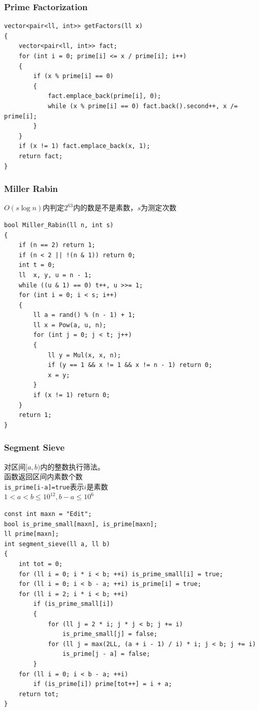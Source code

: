 \documentclass[twoside]{article}
\begin{document}
\subsubsection{Prime Factorization}
\begin{lstlisting}
vector<pair<ll, int>> getFactors(ll x)
{
    vector<pair<ll, int>> fact;
    for (int i = 0; prime[i] <= x / prime[i]; i++)
    {
        if (x % prime[i] == 0)
        {
            fact.emplace_back(prime[i], 0);
            while (x % prime[i] == 0) fact.back().second++, x /= prime[i];
        }
    }
    if (x != 1) fact.emplace_back(x, 1);
    return fact;
}
\end{lstlisting}

\subsubsection{Miller Rabin}

$O(s\log n)$内判定$2^{63}$内的数是不是素数，$s$为测定次数

\begin{lstlisting}
bool Miller_Rabin(ll n, int s)
{
    if (n == 2) return 1;
    if (n < 2 || !(n & 1)) return 0;
    int t = 0;
    ll  x, y, u = n - 1;
    while ((u & 1) == 0) t++, u >>= 1;
    for (int i = 0; i < s; i++)
    {
        ll a = rand() % (n - 1) + 1;
        ll x = Pow(a, u, n);
        for (int j = 0; j < t; j++)
        {
            ll y = Mul(x, x, n);
            if (y == 1 && x != 1 && x != n - 1) return 0;
            x = y;
        }
        if (x != 1) return 0;
    }
    return 1;
}
\end{lstlisting}

\subsubsection{Segment Sieve}

对区间$[a,b)$内的整数执行筛法。\\
函数返回区间内素数个数\\
\texttt{is\_prime[i-a]=true}表示$i$是素数\\
$1<a<b \le 10^{12}, b-a \le 10^6$
\begin{lstlisting}
const int maxn = "Edit";
bool is_prime_small[maxn], is_prime[maxn];
ll prime[maxn];
int segment_sieve(ll a, ll b)
{
    int tot = 0;
    for (ll i = 0; i * i < b; ++i) is_prime_small[i] = true;
    for (ll i = 0; i < b - a; ++i) is_prime[i] = true;
    for (ll i = 2; i * i < b; ++i)
        if (is_prime_small[i])
        {
            for (ll j = 2 * i; j * j < b; j += i)
                is_prime_small[j] = false;
            for (ll j = max(2LL, (a + i - 1) / i) * i; j < b; j += i)
                is_prime[j - a] = false;
        }
    for (ll i = 0; i < b - a; ++i)
        if (is_prime[i]) prime[tot++] = i + a;
    return tot;
}
\end{lstlisting}
\end{document}
